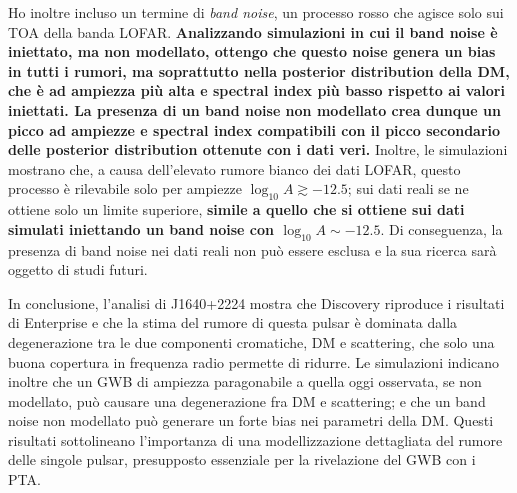\documentclass[12pt]{report}
\begin{document}
Ho inoltre incluso un termine di \textit{band noise}, un processo rosso che
agisce solo sui TOA della banda LOFAR. {\bf Analizzando simulazioni in cui il band noise è iniettato, ma non modellato, ottengo che questo noise genera un bias in tutti i rumori, ma soprattutto nella posterior distribution della DM, che è ad ampiezza più alta e spectral index più basso rispetto ai valori iniettati. La presenza di un band noise non modellato crea dunque un picco ad ampiezze e spectral index compatibili con il picco secondario delle posterior distribution ottenute con i dati veri.}
Inoltre, le simulazioni mostrano che, a causa
dell'elevato rumore bianco dei dati LOFAR, questo processo è rilevabile solo
per ampiezze $\log_{10}A \gtrsim -12.5$; sui dati reali se ne ottiene solo un
limite superiore, {\bf simile a quello che si ottiene sui dati simulati iniettando un band noise con $\log_{10}A\sim-12.5$}. Di conseguenza, la presenza di band noise nei dati reali non può essere esclusa e la sua ricerca sarà oggetto di studi futuri. \par




In conclusione, l'analisi di J1640+2224 mostra che Discovery riproduce i
risultati di Enterprise e che la stima del rumore di questa pulsar è dominata
dalla degenerazione tra le due componenti cromatiche, DM e scattering, che solo
una buona copertura in frequenza radio permette di ridurre. Le simulazioni
indicano inoltre che un GWB di ampiezza paragonabile a quella oggi osservata,
se non modellato, può causare una degenerazione fra DM e scattering; e che un band noise non modellato può generare un forte bias nei parametri della DM. Questi risultati
sottolineano l'importanza di una modellizzazione dettagliata del rumore delle
singole pulsar, presupposto essenziale per la rivelazione del GWB con i PTA.
\par
\end{document}
